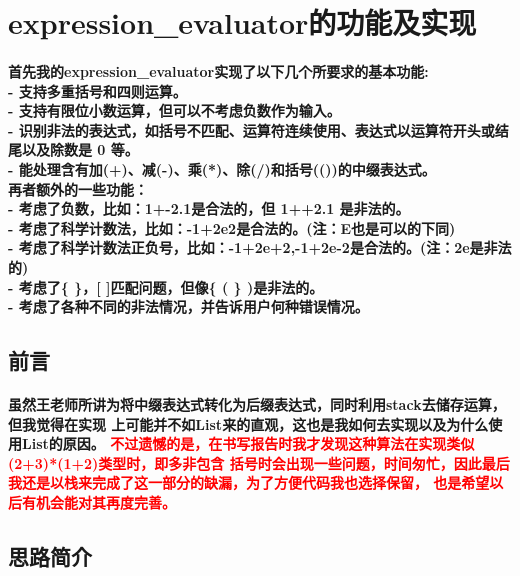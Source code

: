 \documentclass[UTF8]{ctexart}
\begin{document}
\pagestyle{fancy}
\fancyhead{}
\setlength{\headheight}{12.64723pt}

\section{expression\_evaluator的功能及实现}

\paragraph{
首先我的expression\_evaluator实现了以下几个所要求的基本功能: \\
- 支持多重括号和四则运算。\\
- 支持有限位小数运算，但可以不考虑负数作为输入。\\
- 识别非法的表达式，如括号不匹配、运算符连续使用、表达式以运算符开头或结尾以及除数是 0 等。\\
- 能处理含有加(+)、减(-)、乘(*)、除(/)和括号(())的中缀表达式。\\
再者额外的一些功能：\\
- 考虑了负数，比如：1+-2.1是合法的，但 1++2.1 是非法的。\\
- 考虑了科学计数法，比如：-1+2e2是合法的。(注：E也是可以的下同)\\
- 考虑了科学计数法正负号，比如：-1+2e+2,-1+2e-2是合法的。(注：2e是非法的)\\
- 考虑了\{ \}，[ ]匹配问题，但像\{ ( \} )是非法的。\\
- 考虑了各种不同的非法情况，并告诉用户何种错误情况。\\
}
\subsection{前言}
\paragraph{\hspace{2em}
虽然王老师所讲为将中缀表达式转化为后缀表达式，同时利用stack去储存运算，但我觉得在实现
上可能并不如List来的直观，这也是我如何去实现以及为什么使用List的原因。
\textcolor{red}{不过遗憾的是，在书写报告时我才发现这种算法在实现类似(2+3)*(1+2)类型时，即多非包含
括号时会出现一些问题，时间匆忙，因此最后我还是以栈来完成了这一部分的缺漏，为了方便代码我也选择保留，
也是希望以后有机会能对其再度完善。}
}
\subsection{思路简介}
\end{document}
